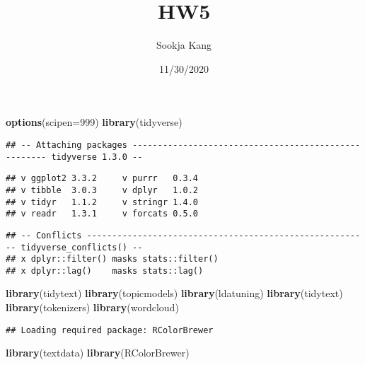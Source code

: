 \documentclass[
]{article}
\title{HW5}
\author{Sookja Kang}
\date{11/30/2020}
\newenvironment{Shaded}{\begin{snugshade}}{\end{snugshade}}
\newcommand{\DataTypeTok}[1]{\textcolor[rgb]{0.13,0.29,0.53}{#1}}
\newcommand{\DecValTok}[1]{\textcolor[rgb]{0.00,0.00,0.81}{#1}}
\newcommand{\KeywordTok}[1]{\textcolor[rgb]{0.13,0.29,0.53}{\textbf{#1}}}
\newcommand{\NormalTok}[1]{#1}
\begin{document}
\maketitle

\begin{Shaded}
\begin{Highlighting}[]
\KeywordTok{options}\NormalTok{(}\DataTypeTok{scipen=}\DecValTok{999}\NormalTok{)}
\KeywordTok{library}\NormalTok{(tidyverse)}
\end{Highlighting}
\end{Shaded}

\begin{verbatim}
## -- Attaching packages ----------------------------------------------------- tidyverse 1.3.0 --
\end{verbatim}

\begin{verbatim}
## v ggplot2 3.3.2     v purrr   0.3.4
## v tibble  3.0.3     v dplyr   1.0.2
## v tidyr   1.1.2     v stringr 1.4.0
## v readr   1.3.1     v forcats 0.5.0
\end{verbatim}

\begin{verbatim}
## -- Conflicts -------------------------------------------------------- tidyverse_conflicts() --
## x dplyr::filter() masks stats::filter()
## x dplyr::lag()    masks stats::lag()
\end{verbatim}

\begin{Shaded}
\begin{Highlighting}[]
\KeywordTok{library}\NormalTok{(tidytext)}
\KeywordTok{library}\NormalTok{(topicmodels)}
\KeywordTok{library}\NormalTok{(ldatuning)}
\KeywordTok{library}\NormalTok{(tidytext)}
\KeywordTok{library}\NormalTok{(tokenizers)}
\KeywordTok{library}\NormalTok{(wordcloud)}
\end{Highlighting}
\end{Shaded}

\begin{verbatim}
## Loading required package: RColorBrewer
\end{verbatim}

\begin{Shaded}
\begin{Highlighting}[]
\KeywordTok{library}\NormalTok{(textdata)}
\KeywordTok{library}\NormalTok{(RColorBrewer)}
\end{Highlighting}
\end{Shaded}
\end{document}
